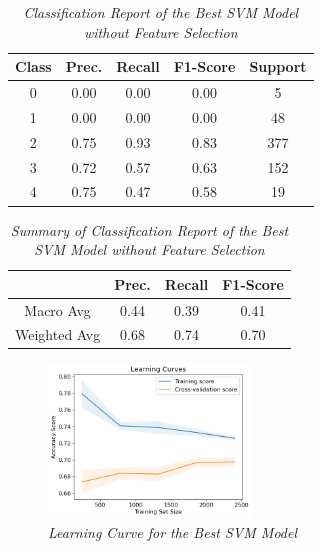 \documentclass[11pt]{article}
\begin{document}
\begin{table}[!ht]
    \begin{center}
        \begin{tabular}{c|c|c|c|c}			
            \hline
            Class & Prec. & Recall & F1-Score & Support \\
            \hline\hline
            0 & 0.00 & 0.00 & 0.00 & 5 \\
            1 & 0.00 & 0.00 & 0.00 & 48 \\
            2 & 0.75 & 0.93 & 0.83 & 377 \\
            3 & 0.72 & 0.57 & 0.63 & 152 \\
            4 & 0.75 & 0.47 & 0.58 & 19\\
                \hline
        \end{tabular}

        \caption{\textit{Classification Report of the Best SVM Model without Feature Selection}}
        \label{svm-report}

    \end{center}
\end{table}
\begin{table}[!ht]
    \begin{center}
        \begin{tabular}{c||c|c|c}			
            \hline
             & Prec. & Recall & F1-Score \\
            \hline\hline
            Macro Avg & 0.44 & 0.39 & 0.41 \\
            Weighted Avg & 0.68 & 0.74 & 0.70 \\
                \hline
        \end{tabular}

        \caption{\textit{Summary of Classification Report of the Best SVM Model without Feature Selection}}
        \label{svm-report-sum}

    \end{center}
\end{table}
\begin{figure}[!ht]
	\centering
	\includegraphics[width = 0.48\textwidth]{res/svm-lc.png}
\caption{\textit{Learning Curve for the Best SVM Model}}
	\label{fig:svm-lc}
\end{figure}
\end{document}
